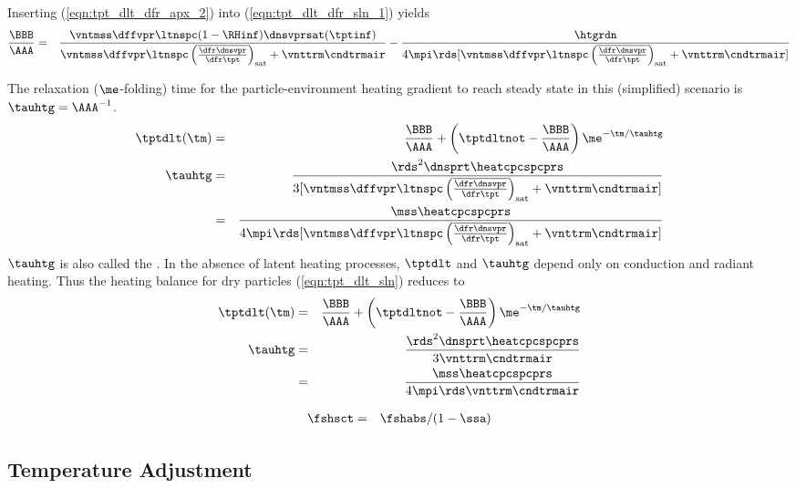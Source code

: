 \documentclass[12pt,twoside]{book}
\begin{document}
Inserting (\ref{eqn:tpt_dlt_dfr_apx_2}) into
(\ref{eqn:tpt_dlt_dfr_sln_1}) yields
\begin{eqnarray}
\frac{\BBB}{\AAA} & = & 
\frac{\vntmss \dffvpr \ltnspc ( 1 - \RHinf ) \dnsvprsat ( \tptinf )}
{\vntmss \dffvpr \ltnspc 
\left( \overline{\frac{\dfr\dnsvpr}{\dfr\tpt}} \right)_{\mathrm{sat}} +
\vnttrm \cndtrmair} -
\frac{\htgrdn}
{4 \mpi \rds [\vntmss \dffvpr \ltnspc 
\left( \overline{\frac{\dfr\dnsvpr}{\dfr\tpt}} \right)_{\mathrm{sat}} +
\vnttrm \cndtrmair ]}
\label{eqn:htg_std_stt_dfn}
\end{eqnarray}

The relaxation ($\me$-folding) time for the particle-environment heating
gradient to reach steady state in this (simplified) scenario is
$\tauhtg = \AAA^{-1}$. 
\begin{eqnarray}
\tptdlt( \tm ) & = & \frac{\BBB}{\AAA} + 
\left( \tptdltnot - \frac{\BBB}{\AAA} \right) \me^{- \tm / \tauhtg} 
\nonumber \\
\tauhtg & = & 
\frac{\rds^{2} \dnsprt \heatcpcspcprs}
{3 [\vntmss \dffvpr \ltnspc 
\left( \overline{\frac{\dfr\dnsvpr}{\dfr\tpt}} \right)_{\mathrm{sat}} +
\vnttrm \cndtrmair ]} \nonumber \\
& = & 
\frac{\mss \heatcpcspcprs}
{4 \mpi \rds [\vntmss \dffvpr \ltnspc 
\left(\overline{\frac{\dfr\dnsvpr}{\dfr\tpt}} \right)_{\mathrm{sat}} +
\vnttrm \cndtrmair ]}
\label{eqn:tpt_dlt_sln}
\end{eqnarray}
$\tauhtg$ is also called the .
In the absence of latent heating processes, $\tptdlt$ and $\tauhtg$
depend only on conduction and radiant heating.
Thus the heating balance for dry particles (\ref{eqn:tpt_dlt_sln})
reduces to  
\begin{eqnarray}
\tptdlt( \tm ) & = & \frac{\BBB}{\AAA} + 
\left( \tptdltnot - \frac{\BBB}{\AAA} \right) \me^{- \tm / \tauhtg} 
\nonumber \\
\tauhtg & = & 
\frac{\rds^{2} \dnsprt \heatcpcspcprs}{3 \vnttrm \cndtrmair } \nonumber \\
& = & 
\frac{\mss \heatcpcspcprs}{4 \mpi \rds \vnttrm \cndtrmair }
\label{eqn:tpt_dlt_sln_dry}
\end{eqnarray}

\begin{eqnarray}
\fshsct & = & \fshabs / ( 1 - \ssa )
\label{eqn:fsh_sct_dfn}
\end{eqnarray}

\subsection{Temperature Adjustment}\label{sxn:tpt_adj}
\end{document}
